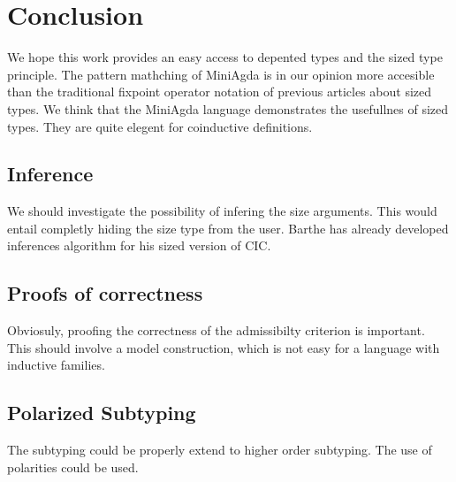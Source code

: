 \chapter{Conclusion}
We hope this work provides an easy access to depented types and the sized type principle.
The pattern mathching of MiniAgda is in our opinion more accesible than the traditional fixpoint operator
notation of previous articles about sized types.
We think that the MiniAgda language demonstrates the usefullnes of sized types.
They are quite elegent for coinductive definitions.
\section{Inference}
We should investigate the possibility of infering the size arguments.
This would entail completly hiding the size type from the user.
Barthe has already developed inferences algorithm for his sized version of CIC.
\section{Proofs of correctness}
Obviosuly, proofing the correctness of the admissibilty criterion is important.
This should involve a model construction, which is not easy for a language with inductive families.
\section{Polarized Subtyping}
The subtyping could be properly extend to higher order subtyping.
The use of polarities could be used.
